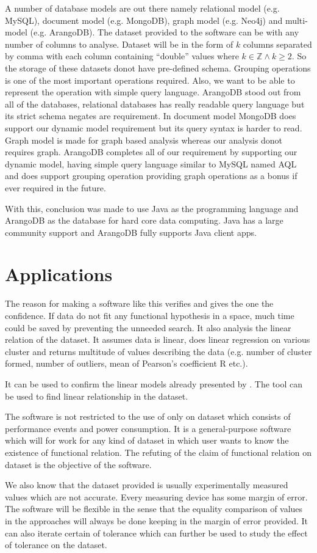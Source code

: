 A number of database models are out there namely relational model (e.g. MySQL), document model (e.g. MongoDB), graph model (e.g. Neo4j) and multi-model (e.g. ArangoDB). The dataset provided to the software can be with any number of columns to analyse. Dataset will be in the form of \(k\) columns separated by comma with each column containing ``double'' values where \(k \in \mathbb{Z} \wedge k \geq 2\). So the storage of these datasets donot have pre-defined schema. Grouping operations is one of the most important operations required. Also, we want to be able to represent the operation with simple query language. ArangoDB stood out from all of the databases, relational databases has really readable query language but its strict schema negates are requirement. In document model MongoDB does support our dynamic model requirement but its query syntax is harder to read. Graph model is made for graph based analysis whereas our analysis donot requires graph. ArangoDB completes all of our requirement by supporting our dynamic model, having simple query language similar to MySQL named AQL and does support grouping operation providing graph operations as a bonus if ever required in the future.

With this, conclusion was made to use Java as the programming language and ArangoDB as the database for hard core data computing. Java has a large community support and ArangoDB fully supports Java client apps.

\section{Applications}

The reason for making a software like this verifies and gives the one the confidence. If data do not fit any functional hypothesis in a space, much time could be saved by preventing the unneeded search. It also analysis the linear relation of the dataset. It assumes data is linear, does linear regression on various cluster and returns multitude of values describing the data (e.g. number of cluster formed, number of outliers, mean of Pearson's coefficient R etc.).

It can be used to confirm the linear models already presented by \cite{bircher2007complete}\cite{bellosa2000benefits}\cite{o2017survey}. The tool can be used to find linear relationship in the dataset. 

The software is not restricted to the use of only on dataset which consists of performance events and power consumption. It is a general-purpose software which will for work for any kind of dataset in which user wants to know the existence of functional relation. The refuting of the claim of functional relation on dataset is the objective of the software.

We also know that the dataset provided is usually experimentally measured values which are not accurate. Every measuring device has some margin of error. The software will be flexible in the sense that the equality comparison of values in the approaches will always be done keeping in the margin of error provided. It can also iterate certain of tolerance which can further be used to study the effect of tolerance on the dataset.
